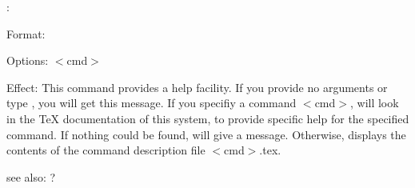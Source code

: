 \colab{} \help:

Format: 

Options: $<$cmd$>$

Effect: This command provides a help facility. If you provide no
        arguments or type , you will get this message.
	If you specifiy a command $<$cmd$>$, \FORWARD{} will look in
	the \TeX{} documentation of this system, to provide specific
	help for the specified command. If nothing could be found,
	\FORWARD{} will give a message.
	Otherwise, \FORWARD{} displays the contents of the command
	description file $<$cmd$>$.tex.

see also: ?
